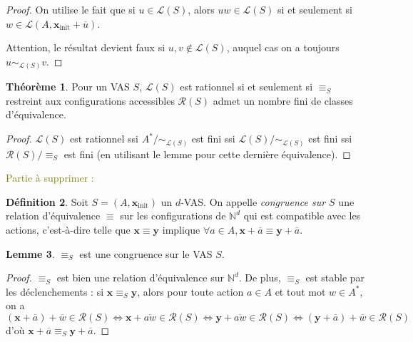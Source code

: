 \documentclass[a4paper,final]{article}
\theoremstyle{definition}
\newtheorem{Theorem}{Théorème}
\newtheorem{Definition}[Theorem]{Définition}
\newtheorem{Lemma}[Theorem]{Lemme}
\newcommand{\lucas}[1]{\textcolor{olive}{#1}}
\newcommand{\N}{\ensuremath{\mathbb{N}}}
\newcommand{\lang}{\ensuremath{\mathcal{L}}}
\newcommand{\conf}{\ensuremath{\mathcal{R}}}
\newcommand{\vect}[1]{\ensuremath{\mathbf{#1}}}
\newcommand{\rel}{\ensuremath{\equiv}}
\newcommand{\equivaut}{\ensuremath{\Leftrightarrow}}
\newcommand{\xinit}{\ensuremath{\vect{x}_\text{init}}}
\newcommand{\valeur}[1]{\ensuremath{\overline{#1}}}
\begin{document}
\begin{proof}
On utilise le fait que si $u\in\lang(S)$, alors
$uw\in\lang(S)$ si et seulement si $w\in\lang(A,\xinit +\valeur{u})$.

Attention, le résultat devient faux si $u,v\notin\lang(S)$, auquel cas on a toujours $u\sim_{\lang(S)}v$.
\end{proof}

\begin{Theorem}
    Pour un VAS $S$, $\lang(S)$ est rationnel si et seulement si $\rel_S$ restreint aux configurations accessibles $\conf(S)$ admet un nombre fini de classes d'équivalence.
\end{Theorem}

\begin{proof}
$\lang(S)$ est rationnel 
ssi $A^\ast/\sim_{\lang(S)}$ est fini 
ssi $\lang(S)/\sim_{\lang(S)}$ est fini 
ssi $\conf(S)/\rel_S$ est fini (en utilisant le lemme pour cette dernière équivalence).
\end{proof}


\lucas{Partie à supprimer :}
\color{red} %

\begin{Definition}
Soit $S=(A,\xinit)$ un $d$-VAS.
On appelle \emph{congruence sur $S$} une relation d'équivalence $\rel$ sur les configurations de $\N^d$ qui est compatible avec les actions, 
c'est-à-dire telle que $\vect{x}\rel \vect{y}$ implique $\forall a\in A, \vect{x} +\valeur{a} \rel \vect{y} +\valeur{a}$.
\end{Definition}



\begin{Lemma}
 $\rel_S$ est une congruence sur le VAS $S$.
\end{Lemma}

\begin{proof}
$\rel_S$ est bien une relation d'équivalence sur $\N^d$.
De plus, $\rel_S$ est stable par les déclenchements : 
si $\vect{x}\rel_S \vect{y}$, alors pour toute action $a\in A$ et tout mot $w\in A^\ast$, 
on a $$(\vect{x} +\valeur{a}) +\valeur{w} \in\conf(S) 
    \equivaut \vect{x} +\valeur{aw} \in\conf(S)
    \equivaut \vect{y} +\valeur{aw} \in\conf(S)
    \equivaut (\vect{y} +\valeur{a}) +\valeur{w} \in\conf(S)$$
d'où $\vect{x}+\valeur{a} \rel_S \vect{y}+\valeur{a}$.
\end{proof}
\end{document}
